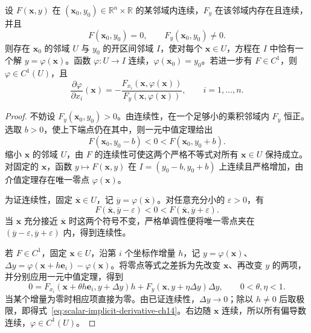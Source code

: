 \begin{theorem}[单个方程的隐函数存在定理]
\label{thm:scalar-implicit-function-ch14}
设 $F(\boldsymbol x,y)$ 在 $(\boldsymbol x_0,y_0)\in\mathbb R^n\times\mathbb R$ 的某邻域内连续，$F_y$ 在该邻域内存在且连续，并且
\[
    F(\boldsymbol x_0,y_0)=0,\qquad F_y(\boldsymbol x_0,y_0)\ne0.
\]
则存在 $\boldsymbol x_0$ 的邻域 $U$ 与 $y_0$ 的开区间邻域 $I$，使对每个 $\boldsymbol x\in U$，方程在 $I$ 中恰有一个解 $y=\varphi(\boldsymbol x)$。函数 $\varphi:U\to I$ 连续，$\varphi(\boldsymbol x_0)=y_0$。若进一步有 $F\in C^1$，则 $\varphi\in C^1(U)$，且
\begin{equation}
\label{eq:scalar-implicit-derivative-ch14}
    \frac{\partial\varphi}{\partial x_i}(\boldsymbol x)
    =-\frac{F_{x_i}(\boldsymbol x,\varphi(\boldsymbol x))}
             {F_y(\boldsymbol x,\varphi(\boldsymbol x))},
    \qquad i=1,\ldots,n.
\end{equation}
\end{theorem}
\begin{proof}
不妨设 $F_y(\boldsymbol x_0,y_0)>0$。由连续性，在一个足够小的乘积邻域内 $F_y$ 恒正。选取 $b>0$，使上下端点仍在其中，则一元中值定理给出
\[
    F(\boldsymbol x_0,y_0-b)<0<F(\boldsymbol x_0,y_0+b).
\]
缩小 $\boldsymbol x$ 的邻域 $U$，由 $F$ 的连续性可使这两个严格不等式对所有 $\boldsymbol x\in U$ 保持成立。对固定的 $\boldsymbol x$，函数 $y\mapsto F(\boldsymbol x,y)$ 在 $I=(y_0-b,y_0+b)$ 上连续且严格增加，由介值定理存在唯一零点 $\varphi(\boldsymbol x)$。

为证连续性，固定 $\overline{\boldsymbol x}\in U$，记 $\overline y=\varphi(\overline{\boldsymbol x})$。对任意充分小的 $\varepsilon>0$，有
\[
    F(\overline{\boldsymbol x},\overline y-\varepsilon)<0
       <F(\overline{\boldsymbol x},\overline y+\varepsilon).
\]
当 $\boldsymbol x$ 充分接近 $\overline{\boldsymbol x}$ 时这两个符号不变，严格单调性便将唯一零点夹在 $(\overline y-\varepsilon,\overline y+\varepsilon)$ 内，得到连续性。

若 $F\in C^1$，固定 $\boldsymbol x\in U$，沿第 $i$ 个坐标作增量 $h$，记 $y=\varphi(\boldsymbol x)$、$\Delta y=\varphi(\boldsymbol x+h\boldsymbol e_i)-\varphi(\boldsymbol x)$。将零点等式之差拆为先改变 $\boldsymbol x$、再改变 $y$ 的两项，并分别应用一元中值定理，得到
\[
    0=F_{x_i}(\boldsymbol x+\theta h\boldsymbol e_i,y+\Delta y)h
       +F_y(\boldsymbol x,y+\eta\Delta y)\Delta y,
       \qquad 0<\theta,\eta<1.
\]
当某个增量为零时相应项直接为零。由已证连续性，$\Delta y\to0$；除以 $h\ne0$ 后取极限，即得式~\eqref{eq:scalar-implicit-derivative-ch14}。右边随 $\boldsymbol x$ 连续，所以所有偏导数连续，$\varphi\in C^1(U)$。
\end{proof}

